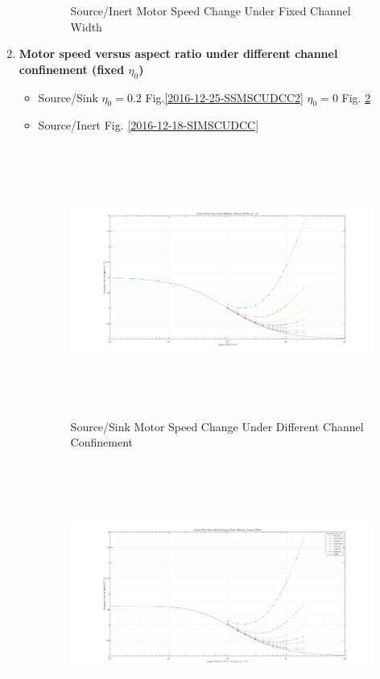 \documentclass[fontsize=11pt, %
                             paper=a4, %
                             twoside, %
                             captions=tableheading,
                             index=totoc,
                             hyperref]{labbook}
\begin{document}
\begin{addmargin}[4cm]{0cm}
\begin{enumerate}
\begin{itemize}
\begin{figure}
\caption{Source/Inert Motor Speed Change Under Fixed Channel Width}\label{2016-12-18-SIMSCUFCW}
\end{figure}
\end{itemize}
\item \textbf{Motor speed versus aspect ratio under different channel confinement (fixed $\eta_0$)}\\
\begin{itemize}
\item Source/Sink $\eta_0=0.2$ Fig.\ref{2016-12-25-SSMSCUDCC2} $\eta_0=0$ Fig. \ref{2016-12-25-SSMSCUDCC0}
\item Source/Inert Fig. \ref{2016-12-18-SIMSCUDCC}

\begin{figure}
\centering
\includegraphics[width=\linewidth, height=3.5in]{2016-12-26-DiffChannel_SourceSink_eta0.png}
\caption{Source/Sink Motor Speed Change Under Different Channel Confinement}\label{2016-12-25-SSMSCUDCC0}
\end{figure}
\begin{figure}
\centering
\includegraphics[width=\linewidth, height=3.5in]{2016-12-25-DiffChannel_SourceSink_eta02.png}

\end{figure}
\end{itemize}
\end{enumerate}
\end{addmargin}
\end{document}

